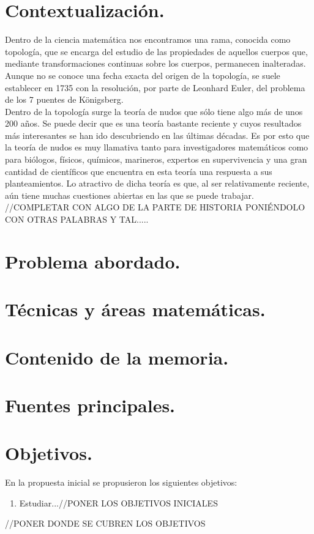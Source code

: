 \section{Contextualización.}
Dentro de la ciencia matemática nos encontramos una rama, conocida como topología, que se encarga del estudio de las propiedades de aquellos cuerpos que, mediante transformaciones continuas sobre los cuerpos, permanecen inalteradas. Aunque no se conoce una fecha exacta del origen de la topología, se suele establecer en 1735 con la resolución, por parte de Leonhard Euler, del problema de los 7 puentes de Königsberg.\\

Dentro de la topología surge la teoría de nudos que sólo tiene algo más de unos 200 años. Se puede decir que es una teoría bastante reciente y cuyos resultados más interesantes se han ido descubriendo en las últimas décadas. Es por esto que la teoría de nudos es muy llamativa tanto para investigadores matemáticos como para biólogos, físicos, químicos, marineros, expertos en supervivencia y una gran cantidad de científicos que encuentra en esta teoría una respuesta a sus planteamientos. Lo atractivo de dicha teoría es que, al ser relativamente reciente, aún tiene muchas cuestiones abiertas en las que se puede trabajar. \\

//COMPLETAR CON ALGO DE LA PARTE DE HISTORIA PONIÉNDOLO CON OTRAS PALABRAS Y TAL.....



\section{Problema abordado.}

\section{Técnicas y áreas matemáticas.}

\section{Contenido de la memoria.}

\section{Fuentes principales.}

\section{Objetivos.}

En la propuesta inicial se propusieron los siguientes objetivos:

\begin{enumerate}
\item Estudiar...//PONER LOS OBJETIVOS INICIALES
\end{enumerate}

//PONER DONDE SE CUBREN LOS OBJETIVOS